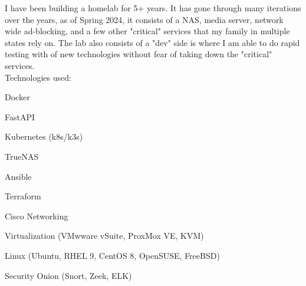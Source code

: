 \documentclass[a4paper,10pt]{article}
\begin{document}
I have been building a homelab for 5+ years. It has gone through many iterations over the years, as of Spring 2024, it consists of a NAS, media server, network wide ad-blocking, and a few other "critical" services that my family in multiple states rely on. The lab also consists of a "dev" side is where I am able to do rapid testing with of new technologies without fear of taking down the "critical" services. 
\\
Technologies used:
\begin{itemize}
    \small
    \begin{multicols}{2}
    \item Docker
    \item FastAPI
    \item Kubernetes (k8s/k3s)
    \item TrueNAS
    \item Ansible
    \item Terraform
    \item Cisco Networking
    \item Virtualization (VMwware vSuite, ProxMox VE, KVM)
    \item Linux (Ubuntu, RHEL 9, CentOS 8, OpenSUSE, FreeBSD)
    \item Security Onion (Snort, Zeek, ELK)
    \end{multicols}
\end{itemize}
\end{document}
